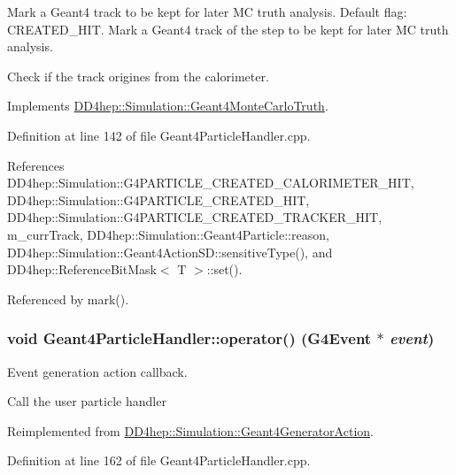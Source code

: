 Mark a Geant4 track to be kept for later MC truth analysis. Default flag: CREATED\_\-HIT. Mark a Geant4 track of the step to be kept for later MC truth analysis. 

Check if the track origines from the calorimeter. 

Implements \hyperlink{class_d_d4hep_1_1_simulation_1_1_geant4_monte_carlo_truth_ad74253c38fb6e00003b591a07e5e748d}{DD4hep::Simulation::Geant4MonteCarloTruth}.

Definition at line 142 of file Geant4ParticleHandler.cpp.

References DD4hep::Simulation::G4PARTICLE\_\-CREATED\_\-CALORIMETER\_\-HIT, DD4hep::Simulation::G4PARTICLE\_\-CREATED\_\-HIT, DD4hep::Simulation::G4PARTICLE\_\-CREATED\_\-TRACKER\_\-HIT, m\_\-currTrack, DD4hep::Simulation::Geant4Particle::reason, DD4hep::Simulation::Geant4ActionSD::sensitiveType(), and DD4hep::ReferenceBitMask$<$ T $>$::set().

Referenced by mark().\hypertarget{class_d_d4hep_1_1_simulation_1_1_geant4_particle_handler_a239e9338d41588f5dcfc3ea012aba02a}{
\subsubsection[{operator()}]{\setlength{\rightskip}{0pt plus 5cm}void Geant4ParticleHandler::operator() (G4Event $\ast$ {\em event})}}
\label{class_d_d4hep_1_1_simulation_1_1_geant4_particle_handler_a239e9338d41588f5dcfc3ea012aba02a}


Event generation action callback. 

Call the user particle handler 

Reimplemented from \hyperlink{class_d_d4hep_1_1_simulation_1_1_geant4_generator_action_ac5a1d2335a19e3f9d555081199e01801}{DD4hep::Simulation::Geant4GeneratorAction}.

Definition at line 162 of file Geant4ParticleHandler.cpp.


